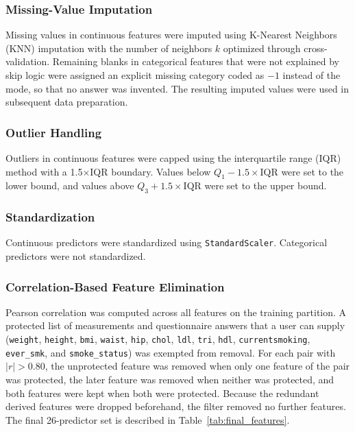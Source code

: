 \subsubsection{Missing-Value Imputation}

Missing values in continuous features were imputed using K-Nearest Neighbors (KNN) imputation with the number of neighbors $k$ optimized through cross-validation. Remaining blanks in categorical features that were not explained by skip logic were assigned an explicit missing category coded as $-1$ instead of the mode, so that no answer was invented. The resulting imputed values were used in subsequent data preparation.

\subsubsection{Outlier Handling}

Outliers in continuous features were capped using the interquartile range (IQR) method with a 1.5$\times$IQR boundary. Values below $Q_1 - 1.5 \times \mathrm{IQR}$ were set to the lower bound, and values above $Q_3 + 1.5 \times \mathrm{IQR}$ were set to the upper bound.

\subsubsection{Standardization}

Continuous predictors were standardized using \texttt{StandardScaler}. Categorical predictors were not standardized.

\subsubsection{Correlation-Based Feature Elimination}

Pearson correlation was computed across all features on the training partition. A protected list of measurements and questionnaire answers that a user can supply (\texttt{weight}, \texttt{height}, \texttt{bmi}, \texttt{waist}, \texttt{hip}, \texttt{chol}, \texttt{ldl}, \texttt{tri}, \texttt{hdl}, \texttt{currentsmoking}, \texttt{ever\_smk}, and \texttt{smoke\_status}) was exempted from removal. For each pair with $|r| > 0.80$, the unprotected feature was removed when only one feature of the pair was protected, the later feature was removed when neither was protected, and both features were kept when both were protected. Because the redundant derived features were dropped beforehand, the filter removed no further features. The final 26-predictor set is described in Table~\ref{tab:final_features}.

